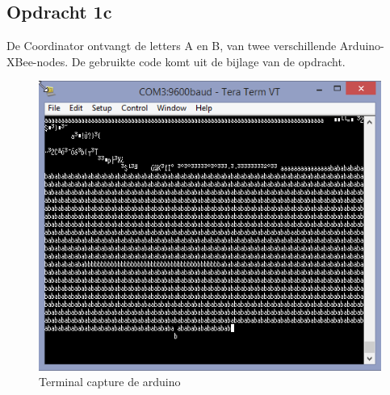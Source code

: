 \documentclass[12pt]{article}
\begin{document}
\subsection*{Opdracht 1c}
De Coordinator ontvangt de letters A en B, van twee verschillende Arduino-XBee-nodes. De gebruikte code komt uit de bijlage van de opdracht.
\begin{center}
\begin{figure}[h]
\includegraphics[scale=1.0]{aba.jpg}
\caption{Terminal capture de arduino}
\label{fig:output7}
\end{figure}
\end{center}
\end{document}
